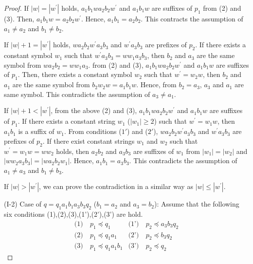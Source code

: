 \begin{proof}
If $|w|=|w^{\prime}|$ holds, $a_{1}b_{1}wa_{2}b_{2}w^{\prime}$ and $a_{1}b_{1}w$ are suffixes of $p_{1}$ from (2) and (3).
Then, $a_{1}b_{1}w=a_{2}b_{2}w^{\prime}$.
Hence, $a_{1}b_{1}=a_{2}b_{2}$.
This contracts the assumption of $a_{1} \ne a_{2}$ and $b_{1} \ne b_{2}$.

If $|w|+1=|w^{\prime}|$ holds, $wa_{2}b_{2}w^{\prime}a_{3}b_{3}$ and $w^{\prime}a_{3}b_{3}$ are prefixes of $p_{2}$.
If there exists a constant symbol $w_{1}$ such that $w^{\prime}a_{3}b_{3}=ww_{1}a_{3}b_{3}$,
then $b_{2}$ and $a_{3}$ are the same symbol from $wa_{2}b_{2}=ww_{1}a_{3}$.
from (2) and (3), $a_{1}b_{1}wa_{2}b_{2}w^{\prime}$ and $a_{1}b_{1}w$ are suffixes of $p_{1}$.
Then, there exists a constant symbol $w_{2}$ such that $w^{\prime}=w_{2}w$,
then $b_{2}$ and $a_{1}$ are the same symbol from $b_{2}w_{2}w=a_{1}b_{1}w$.
Hence, from $b_{2}=a_{3}$, $a_{3}$ and $a_{1}$ are same symbol.
This contradicts the assumption of $a_{3} \ne a_{1}$.

If $|w|+1 < |w^{\prime}|$, from the above (2) and (3), 
$a_{1}b_{1}wa_{2}b_{2}w^{\prime}$ and $a_{1}b_{1}w$ are suffixes of $p_{1}$.
If there exists a constant string $w_{1}$ ($|w_{1}|\geq 2$) such that $w^{\prime}=w_{1}w$, then $a_{1}b_{1}$ is a suffix of $w_{1}$.
From  conditions ($1'$) and ($2'$), 
$wa_{2}b_{2}w^{\prime}a_{3}b_{3}$ and $w^{\prime}a_{3}b_{3}$ are prefixes of $p_{2}$.
If there exist constant strings $w_{1}$ and $w_{2}$ such that $w^{\prime} = w_{1}w=ww_{2}$ holds, then $a_{2}b_{2}$ and $a_{3}b_{3}$ are suffixes of $w_{1}$ from $|w_1|=|w_2|$ and $|ww_{2}a_{3}b_{3}|=|wa_{2}b_{2}w_{1}|$.
Hence, $a_{1}b_{1}=a_{3}b_{3}$.
This contradicts the assumption of $a_{1} \ne a_{3}$ and $b_{1} \ne b_{3}$.

If $|w|>|w^{\prime}|$, we can prove the contradiction in a similar way as $|w|\le|w^{\prime}|$.

\smallskip

\noindent
(I-2) Case of $q=q_{1}a_{1}b_{1}a_{3}b_{3}q_{2}$ ($b_{1}=a_{2}$ and $a_{3}=b_{2}$):
Assume that the following six conditions (1),(2),(3),(1'),(2'),(3') are hold.
\begin{align*}
\textrm{(1)}~& p_{1} \preceq q_{1} & \textrm{(1')}~& p_{2} \preceq a_{3}b_{3}q_{2} \\
\textrm{(2)}~& p_{1} \preceq q_{1}a_{1} & \textrm{(2')}~& p_{2} \preceq b_{3}q_{2} \\
\textrm{(3)}~& p_{1} \preceq q_{1}a_{1}b_{1} & \textrm{(3')}~& p_{2} \preceq q_{2}
\end{align*}


\end{proof}
